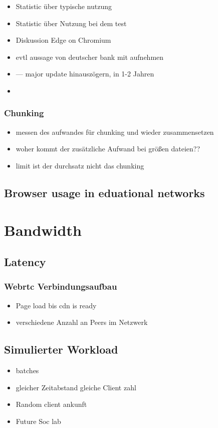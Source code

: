\begin{itemize}
	\item Statistic über typische nutzung
	\item Statistic über Nutzung bei dem test
	\item Diskussion Edge on Chromium
	\item evtl aussage von deutscher bank mit aufnehmen
	\item  --- major update hinauszögern, in 1-2 Jahren
	\item 
\end{itemize}

\subsubsection{Chunking}
\begin{itemize}
	\item messen des aufwandes für chunking und wieder zusammensetzen
	\item woher kommt der zusätzliche Aufwand bei größen dateien??
	\item limit ist der durchsatz nicht das chunking
\end{itemize}

\subsection{Browser usage in eduational networks}

\section{Bandwidth}

\subsection{Latency}

\subsubsection{Webrtc Verbindungsaufbau}

\begin{itemize}
	\item Page load bis cdn is ready
	\item verschiedene Anzahl an Peers im Netzwerk 
\end{itemize}

\subsection{Simulierter Workload}
\begin{itemize}
	\item batches
	\item gleicher Zeitabstand gleiche Client zahl
	\item Random client ankunft
	\item Future Soc lab
\end{itemize}

